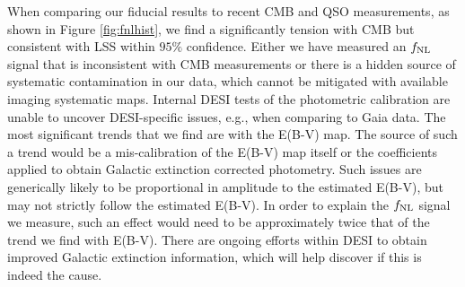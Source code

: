 When comparing our fiducial results to recent CMB and QSO measurements, as shown in Figure \ref{fig:fnlhist}, we find a significantly tension with CMB but consistent with LSS within $95\%$ confidence. Either we have measured an $f_{\rm NL}$ signal that is inconsistent with CMB measurements or there is a hidden source of systematic contamination in our data, which cannot be mitigated with available imaging systematic maps. Internal DESI tests of the photometric calibration are unable to uncover DESI-specific issues, e.g., when comparing to Gaia data. The most significant trends that we find are with the E(B-V) map. The source of such a trend would be a mis-calibration of the E(B-V) map itself or the coefficients applied to obtain Galactic extinction corrected photometry. Such issues are generically likely to be proportional in amplitude to the estimated E(B-V), but may not strictly follow the estimated E(B-V). In order to explain the $f_{\rm NL}$ signal we measure, such an effect would need to be approximately twice that of the trend we find with E(B-V). There are ongoing efforts within DESI to obtain improved Galactic extinction information, which will help discover if this is indeed the cause.





